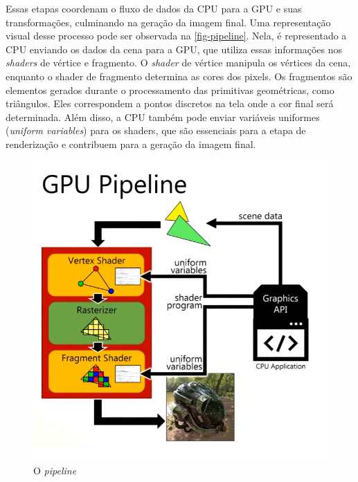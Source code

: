 \documentclass[english, 
               brazil, 
               bsc] %
               {dcomp-abntex2}
\begin{document}


Essas etapas coordenam o fluxo de dados da CPU para a GPU e suas transformações, culminando na geração da imagem final. Uma representação visual desse processo pode ser observada na \autoref{fig-pipeline}. Nela, é representado a CPU enviando os dados da cena para a GPU, que utiliza essas informações nos \textit{shaders} de vértice e fragmento. O \textit{shader} de vértice manipula os vértices da cena, enquanto o shader de fragmento determina as cores dos pixels. Os fragmentos são elementos gerados durante o processamento das primitivas geométricas, como triângulos. Eles correspondem a pontos discretos na tela onde a cor final será determinada. Além disso, a CPU também pode enviar variáveis uniformes (\textit{uniform variables}) para os shaders, que são essenciais para a etapa de renderização e contribuem para a geração da imagem final.


\begin{figure}[H]
        \caption{\label{fig-pipeline} O \textit{pipeline}}
        \begin{center}
            \includegraphics[scale=0.45]{./Imagens/gpu_pipeline.png}
        \end{center}
\end{figure}
\end{document}
